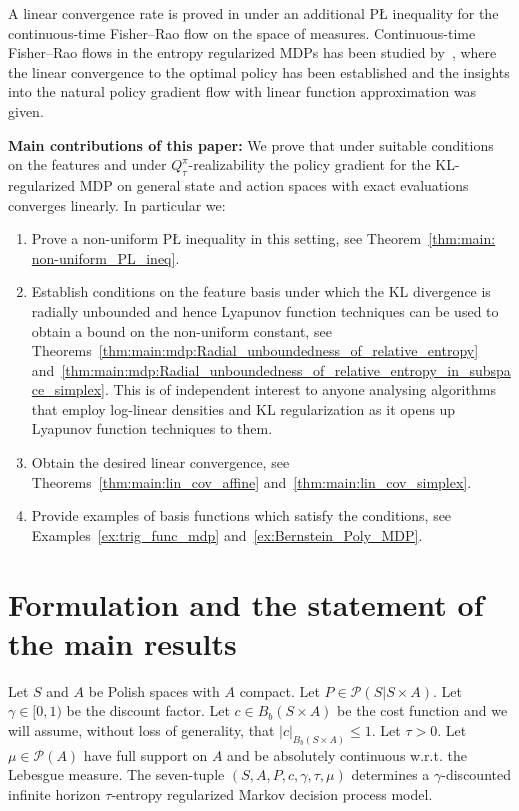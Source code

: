 \documentclass{amsart}
\theoremstyle{definition}
\begin{document}
A linear convergence rate is proved in \cite{liu2023polyak} under an additional P{\L} inequality for the continuous-time Fisher--Rao flow on the space of measures.
Continuous-time Fisher--Rao flows in the entropy regularized MDPs has been studied by~\cite{kerimkulov2025fisher}, where the linear convergence to the optimal policy has been established and the insights into the natural policy gradient flow with linear function approximation was given. 

\textbf{Main contributions of this paper:}
We prove that under suitable conditions on the features and under $Q^\pi_\tau$-realizability the policy gradient for the KL-regularized MDP on general state and action spaces with exact evaluations converges linearly. 
In particular we:
\begin{enumerate}
\item Prove a non-uniform P{\L} inequality in this setting, see Theorem~\ref{thm:main: non-uniform_PL_ineq}.
\item Establish conditions on the feature basis under which the KL divergence is radially unbounded and hence Lyapunov function techniques can be used to obtain a bound on the non-uniform constant, see Theorems~\ref{thm:main:mdp:Radial_unboundedness_of_relative_entropy} and~\ref{thm:main:mdp:Radial_unboundedness_of_relative_entropy_in_subspace_simplex}.
This is of independent interest to anyone analysing algorithms that employ log-linear densities and KL regularization as it opens up Lyapunov function techniques to them.
\item Obtain the desired linear convergence, see Theorems~\ref{thm:main:lin_cov_affine} and~\ref{thm:main:lin_cov_simplex}.
\item Provide examples of basis functions which satisfy the conditions, see Examples~\ref{ex:trig_func_mdp} and~\ref{ex:Bernstein_Poly_MDP}. 
\end{enumerate}

\section{Formulation and the statement of the main results}

Let $S$ and $A$ be Polish spaces with $A$ compact.
Let $P\in \mathcal{P}(S|S\times A)$.
Let  $\gamma\in [0,1)$ be the discount factor.
Let $c\in B_b(S\times A)$ be the cost function and we will assume, without loss of generality, that  $|c|_{B_b(S \times A)}\leq 1$. 
Let $\tau > 0$. 
Let $\mu \in \mathcal P(A)$ have full support on $A$ and be absolutely continuous w.r.t. the Lebesgue measure.
The seven-tuple $(S,A,P,c,\gamma,\tau, \mu)$ determines a $\gamma$-discounted infinite horizon $\tau$-entropy regularized Markov decision process model.
\end{document}

